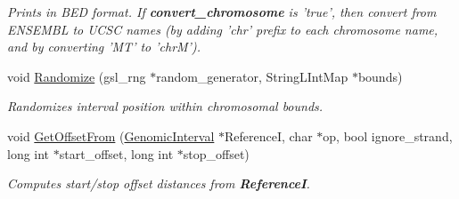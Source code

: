 \begin{DoxyCompactItemize}
\begin{DoxyCompactList}\small\item\em Prints in BED format. If {\bfseries convert\_\-chromosome} is 'true', then convert from ENSEMBL to UCSC names (by adding 'chr' prefix to each chromosome name, and by converting 'MT' to 'chrM'). \end{DoxyCompactList}\item 
\hypertarget{classGenomicInterval_a75aed02c1df83acb5d7ec89e2a9949bd}{
void \hyperlink{classGenomicInterval_a75aed02c1df83acb5d7ec89e2a9949bd}{Randomize} (gsl\_\-rng $\ast$random\_\-generator, StringLIntMap $\ast$bounds)}
\label{classGenomicInterval_a75aed02c1df83acb5d7ec89e2a9949bd}

\begin{DoxyCompactList}\small\item\em Randomizes interval position within chromosomal bounds. \end{DoxyCompactList}\item 
void \hyperlink{classGenomicInterval_aab40ad7dd997948e0c04a13164e955d6}{GetOffsetFrom} (\hyperlink{classGenomicInterval}{GenomicInterval} $\ast$ReferenceI, char $\ast$op, bool ignore\_\-strand, long int $\ast$start\_\-offset, long int $\ast$stop\_\-offset)
\begin{DoxyCompactList}\small\item\em Computes start/stop offset distances from {\bfseries ReferenceI}. \end{DoxyCompactList}\end{DoxyCompactItemize}
